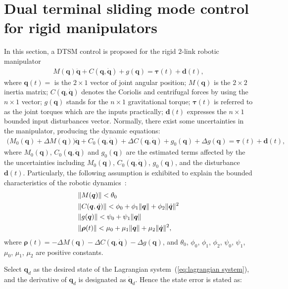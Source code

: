 \documentclass[3p]{elsarticle}
\theoremstyle{plain}
\theoremstyle{remark}
\begin{document}
\section{Dual terminal sliding mode control for rigid manipulators}\label{sec:3}
In this section, a DTSM control is proposed for the rigid $2$-link robotic manipulator
\begin{align}
M(\bm q)\ddot {\bm q}+C(\bm q,\dot {\bm q})+g(\bm q)= \bm\tau(t)+{\bm d}(t),\label{eq:lagrangian system}
\end{align}
where $\bm q(t) = $ is the $2\times 1$ vector of joint angular position; ${M(\bm q)}$ is the $2\times 2$ inertia matrix; ${C(\bm q,\dot{\bm q})}$ denotes the Coriolis and centrifugal forces by using the $n\times1$ vector; ${g(\bm q)}$ stands for the $n\times 1$ gravitational torque; $\bm{\tau}(t)$ is referred to as the joint torques which are the inputs practically; $\bm d(t)$ expresses the $n\times 1$ bounded input disturbances vector. Normally, there exist some uncertainties in the manipulator, producing the dynamic equations:
\begin{align}
(M_0(\bm q)+\Delta {M(\bm q))\ddot {\bm q}}+{C_0(\bm q,\dot {\bm q})+\Delta C(\bm q,\dot {\bm q})}+g_0(\bm q)+\Delta g(\bm q)=\bm {\tau}(t)+\bm{d}(t),
\end{align}
where $M_0(\bm q)$, $C_0(\bm q,\dot {\bm q})$ and $g_0(\bm q)$ are the estimated terms affected by the the uncertainties including $M_0(\bm q)$, $C_0(\bm q,\dot {\bm q})$, $g_0(\bm q)$, and the disturbance $\bm{d}(t)$. Particularly, the following assumption is exhibited to explain the bounded characteristics of the robotic dynamics~\cite{feng2002non}:
\begin{align}
&\Vert M(\bm q)\Vert< \theta_0\notag\\
&\Vert C(\bm q,\dot {\bm q})\Vert< \phi_0+\phi_1\Vert\bm q\Vert+\phi_2\Vert\dot{\bm q}\Vert^2\notag\\
&\Vert g(\bm q)\Vert< \psi_0+\psi_1\Vert\bm q\notag\Vert\\
&\Vert \bm {\rho}(t)\Vert< \mu_0+\mu_1\Vert\bm q\Vert+\mu_2\Vert\dot{\bm q}\Vert^2,\label{eq:manipulator uncertainty}
\end{align}
where $\bm {\rho}(t) = -\Delta M(\bm q)-\Delta C(\bm q,\dot {\bm q})-\Delta g(\bm q)$, and $\theta_0$, $\phi_0$, $\phi_1$, $\phi_2$, $\psi_0$, $\psi_1$, $\mu_0$, $\mu_1$, $\mu_2$ are positive constants.\par
Select $\bm q_d$ as the desired state of the Lagrangian system~(\ref{eq:lagrangian system}), and the derivative of $\bm q_d$ is designated as $\dot {\bm q}_d$. Hence the state error is stated as:
\end{document}
